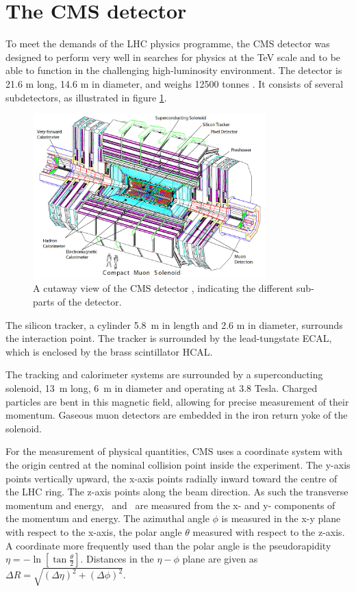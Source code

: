 \section{The \acs{CMS} detector}
\label{sec:CMSLHC_CMS}
To meet the demands of the \ac{LHC} physics programme, the
 \ac{CMS} detector was designed to perform very well in searches
for physics at the TeV scale and to be able to 
function in the challenging high-luminosity environment.
The detector is 21.6 m long, 14.6 m in diameter, and weighs
12500 tonnes \cite{cms-jinst}. It consists of several subdetectors, as illustrated
in figure \ref{fig:cms_detector}.
\begin{figure}[h!]
\includegraphics[width=0.8\textwidth]{./Detector/Plots/cms.png}
\caption{A cutaway view of the \ac{CMS} detector \cite{cms-jinst}, indicating the
different sub-parts of the detector.}
\label{fig:cms_detector}
\end{figure}

The silicon tracker, a cylinder \mbox{5.8 m} in length and \mbox{2.6} m in
diameter, surrounds the interaction point. The tracker is 
surrounded by the lead-tungstate \ac{ECAL}, which is enclosed
by the brass scintillator \ac{HCAL}.

The tracking and calorimeter systems are surrounded by a superconducting
solenoid, \mbox{13 m} long, \mbox{6 m} in diameter and operating at 3.8 Tesla.
Charged particles are bent in this magnetic field, allowing for precise 
measurement of their momentum. Gaseous muon detectors are embedded in the 
iron return yoke of the solenoid.

For the measurement of physical quantities, \ac{CMS} uses a coordinate
system with the origin centred at the nominal collision point
inside the experiment. The y-axis points vertically upward, the x-axis
points radially inward toward the centre of the \ac{LHC} ring. The z-axis
points along the beam direction. As such the transverse momentum and energy, 
\pT~and \ET~are measured from the x- and y- components of the momentum and energy.
The azimuthal angle $\phi$ is measured in the x-y plane with respect to the x-axis, 
the polar angle $\theta$ measured with respect to the z-axis. A coordinate
more frequently used than the polar angle is the pseudorapidity $\eta = -\ln{[\tan{\frac{\theta}{2}}]}$.
Distances in the $\eta-\phi$ plane are given as $\Delta R = \sqrt{(\Delta\eta)^2+(\Delta\phi)^2}$. 

